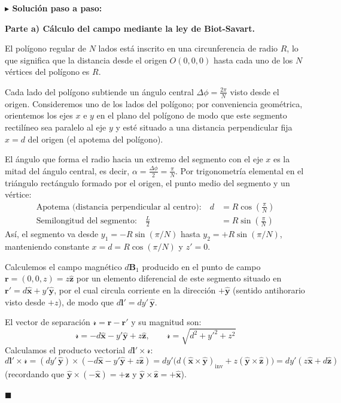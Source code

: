 \documentclass[11pt,a4paper]{book}
\newenvironment{solucion}{%
    \par\medskip\noindent\textbf{\color{blue!65!black}\Large $\blacktriangleright$ Solución paso a paso:}\par\medskip
}{%
    \hfill$\blacksquare$\par\bigskip
}
\newcommand{\xhat}{\hat{\bm{x}}}
\newcommand{\yhat}{\hat{\bm{y}}}
\newcommand{\zhat}{\hat{\bm{z}}}
\newcommand{\Bvec}{\bm{B}}
\newcommand{\rsep}{\boldsymbol{\mathscr{r}}}
\begin{document}
\begin{solucion}
\textbf{Parte a) Cálculo del campo mediante la ley de Biot-Savart.}

El polígono regular de $N$ lados está inscrito en una circunferencia de radio $R$, lo que significa que la distancia desde el origen $O(0,0,0)$ hasta cada uno de los $N$ vértices del polígono es $R$.

Cada lado del polígono subtiende un ángulo central $\Delta\phi = \frac{2\pi}{N}$ visto desde el origen. Consideremos uno de los lados del polígono; por conveniencia geométrica, orientemos los ejes $x$ e $y$ en el plano del polígono de modo que este segmento rectilíneo sea paralelo al eje $y$ y esté situado a una distancia perpendicular fija $x = d$ del origen (el apotema del polígono).

El ángulo que forma el radio hacia un extremo del segmento con el eje $x$ es la mitad del ángulo central, es decir, $\alpha = \frac{\Delta\phi}{2} = \frac{\pi}{N}$. Por trigonometría elemental en el triángulo rectángulo formado por el origen, el punto medio del segmento y un vértice:
\begin{align}
    \text{Apotema (distancia perpendicular al centro):} \quad d &= R \cos\left(\frac{\pi}{N}\right) \\
    \text{Semilongitud del segmento:} \quad \frac{L}{2} &= R \sin\left(\frac{\pi}{N}\right)
\end{align}
Así, el segmento va desde $y_1 = -R\sin(\pi/N)$ hasta $y_2 = +R\sin(\pi/N)$, manteniendo constante $x = d = R\cos(\pi/N)$ y $z' = 0$.

Calculemos el campo magnético $d\Bvec_1$ producido en el punto de campo $\bm{r} = (0,0,z) = z\zhat$ por un elemento diferencial de este segmento situado en $\bm{r}' = d\xhat + y'\yhat$, por el cual circula corriente en la dirección $+\yhat$ (sentido antihorario visto desde $+z$), de modo que $d\bm{l}' = dy'\,\yhat$.

El vector de separación $\rsep = \bm{r} - \bm{r}'$ y su magnitud son:
\begin{equation}
    \rsep = -d\xhat - y'\yhat + z\zhat, \qquad \mathscr{r} = \sqrt{d^2 + y'^2 + z^2}
\end{equation}
Calculamos el producto vectorial $d\bm{l}' \times \rsep$:
\begin{equation}
    d\bm{l}' \times \rsep = (dy'\,\yhat) \times (-d\xhat - y'\yhat + z\zhat) = dy'\big( d(\xhat\times\yhat)_{\text{inv}} + z(\yhat\times\zhat) \big) = dy' (z\xhat + d\zhat)
\end{equation}
(recordando que $\yhat \times (-\xhat) = +\zhat$ y $\yhat \times \zhat = +\xhat$).


\end{solucion}
\end{document}
